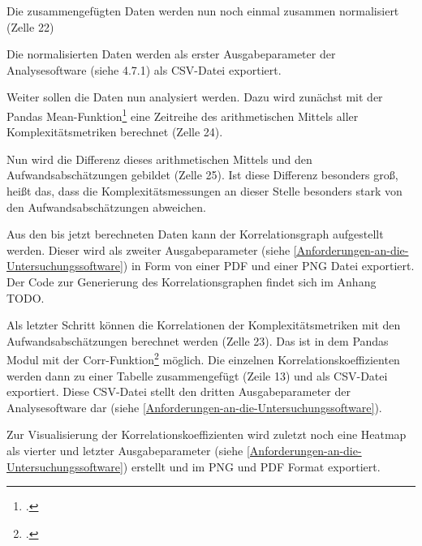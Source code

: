 \lstset{style=pythonStyle}


Die zusammengefügten Daten werden nun noch einmal zusammen normalisiert
(Zelle 22)

\lstset{style=pythonStyle}


Die normalisierten Daten werden als erster Ausgabeparameter der
Analysesoftware (siehe 4.7.1) als \ac{CSV}-Datei exportiert.

Weiter sollen die Daten nun analysiert werden. Dazu wird zunächst mit
der Pandas Mean-Funktion\footcite[Vgl. ][]{PandasDataFrameMean} eine Zeitreihe
des arithmetischen Mittels aller Komplexitätsmetriken berechnet (Zelle
24).

\lstset{style=pythonStyle}


Nun wird die Differenz dieses arithmetischen Mittels und den
Aufwandsabschätzungen gebildet (Zelle 25). Ist diese Differenz besonders
gro\ss , hei\ss t das, dass die Komplexitätsmessungen an dieser Stelle
besonders stark von den Aufwandsabschätzungen abweichen.

\lstset{style=pythonStyle}


Aus den bis jetzt berechneten Daten kann der Korrelationsgraph
aufgestellt werden. Dieser wird als zweiter Ausgabeparameter (siehe \ref{Anforderungen-an-die-Untersuchungssoftware}) in Form von einer
\ac{PDF} und einer \ac{PNG} Datei exportiert. Der Code zur Generierung des Korrelationsgraphen findet sich im Anhang TODO.

Als letzter Schritt können die Korrelationen der Komplexitätsmetriken
mit den Aufwandsabschätzungen berechnet werden (Zelle 23). Das ist in
dem Pandas Modul mit der Corr-Funktion\footcite[Vgl. ][]{PandasDataFrameCorr}
möglich. Die einzelnen Korrelationskoeffizienten werden dann zu einer
Tabelle zusammengefügt (Zeile 13) und als \ac{CSV}-Datei exportiert. Diese
\ac{CSV}-Datei stellt den dritten Ausgabeparameter der Analysesoftware dar
(siehe \ref{Anforderungen-an-die-Untersuchungssoftware}).

Zur Visualisierung der Korrelationskoeffizienten wird zuletzt noch eine
Heatmap als vierter und letzter Ausgabeparameter (siehe \ref{Anforderungen-an-die-Untersuchungssoftware}) erstellt
und im \ac{PNG} und \ac{PDF} Format exportiert.

